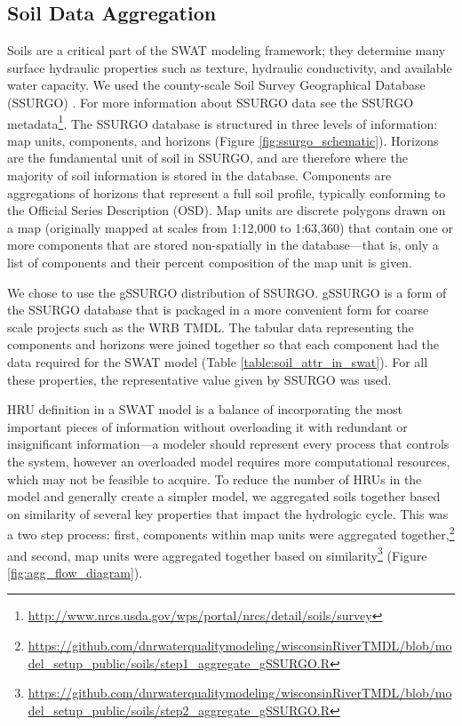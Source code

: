 \subsection{Soil Data Aggregation}\label{sec:soils}

Soils are a critical part of the SWAT modeling framework; they determine many
surface hydraulic properties such as texture, hydraulic conductivity, and
available water capacity. We used the county-scale Soil Survey Geographical
Database (SSURGO) . For more information about SSURGO
data see the SSURGO metadata\footnote{\url{http://www.nrcs.usda.gov/wps/portal/nrcs/detail/soils/survey}}.
The SSURGO database is structured in three levels of information: map units,
components, and horizons (Figure \ref{fig:ssurgo_schematic}). Horizons are the fundamental unit of soil in SSURGO, and are therefore where the majority of soil information is stored in the database.
Components are aggregations of horizons that represent a full soil profile,
typically conforming to the Official Series Description (OSD). Map units
are discrete polygons drawn on a map (originally mapped at scales from 1:12,000
to 1:63,360) that contain one or more components that are stored non-spatially
in the database---that is, only a list of components and their percent
composition of the map unit is given. 

We chose to use the gSSURGO distribution of SSURGO. gSSURGO is a form of the SSURGO database that is packaged in a more convenient form for coarse scale projects such as the WRB TMDL. The tabular data representing the components and
horizons were joined together so that each component had the data required for
the SWAT model (Table \ref{table:soil_attr_in_swat}). For all these properties, the representative value given by
SSURGO was used.

HRU definition in a SWAT model is a balance of incorporating the most important
pieces of information without overloading it with redundant or insignificant
information---a modeler should represent every process that controls the system,
however an overloaded model requires more computational resources, which may not
be feasible to acquire. To reduce the number of HRUs in the model and generally create a 
simpler model, we aggregated
soils together based on similarity of several key properties that impact the
hydrologic cycle. This was a two step process: first, components within map
units were aggregated
together,\footnote{\url{https://github.com/dnrwaterqualitymodeling/wisconsinRiverTMDL/blob/model_setup_public/soils/step1_aggregate_gSSURGO.R} } 
and second, map units were aggregated together based on
similarity\footnote{\url{https://github.com/dnrwaterqualitymodeling/wisconsinRiverTMDL/blob/model_setup_public/soils/step2_aggregate_gSSURGO.R}} (Figure \ref{fig:agg_flow_diagram}).

